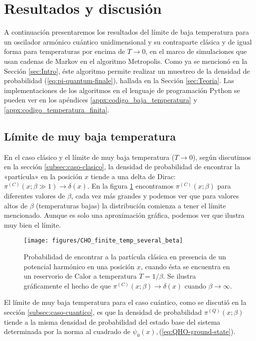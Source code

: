 \documentclass[%
 reprint,
 amsmath,amssymb,
 aps,
 pra,
]{revtex4-2}
\begin{document}
\section{\label{sec:Resultados}Resultados y discusión}
A continuación presentaremos los resultados del límite de baja temperatura para un oscilador armónico cuántico unidimensional y su contraparte clásica y de igual forma para temperaturas por encima de $T \rightarrow 0$, en el marco de simulaciones que usan cadenas de Markov en el algoritmo Metropolis. Como ya se mencionó en la Sección \ref{sec:Intro}, éste algoritmo permite realizar un muestreo de la densidad de probabilidad (\ref{eq:pi-quantum-finale}), hallada en la Sección \ref{sec:Teoria}. Las implementaciones de los algoritmos en el lenguaje de programación Python se pueden ver en los apéndices \ref{appx:codigo_baja_temperatura} y \ref{appx:codigo_temperatura_finita}.

\subsection{Límite de muy baja temperatura}

En el caso clásico y el límite de muy baja temperatura ($T \rightarrow 0 $), según discutimos en la sección \ref{subsec:caso-clasico}, la densidad de probabilidad de encontrar la «partícula» en la posición $x$ tiende a una delta de Dirac: $\pi^{(C)}(x;\beta \gg 1) \rightarrow \delta(x)$. En la figura \ref{fig:classic_probability} encontramos $\pi^{(C)}(x;\beta)$ para diferentes valores de $\beta$, cada vez más grandes y podemos ver que para valores altos de $\beta$ (temperaturas bajas) la distribución comienza a tener el límite mencionado. Aunque es solo una aproximación gráfica, podemos ver que ilustra muy bien el límite.
\begin{figure}[!h]
	\centering
	\texttt{[image: figures/CHO\_finite\_temp\_several\_beta]}
	\caption{Probabilidad de encontrar a la partícula clásica en presencia de un potencial harmónico en una posición $x$, cuando ésta se encuentra en un reservorio de Calor a temperatura $T=1/\beta$. Se ilustra gráficamente el hecho de que $\pi^{(C)}(x;\beta) \rightarrow \delta(x)$ cuando $\beta\rightarrow\infty$.}
	\label{fig:classic_probability}
\end{figure}

El límite de muy baja temperatura para el caso cuántico, como se discutió en la sección \ref{subsec:caso-cuantico}, es que la densidad de probabilidad $\pi^{(Q)}(x;\beta)$ tiende a la misma densidad de probabilidad del estado base del sistema determinada por la norma al cuadrado de $\psi_0(x), $(\ref{eq:QHO-ground-state}).
\end{document}
